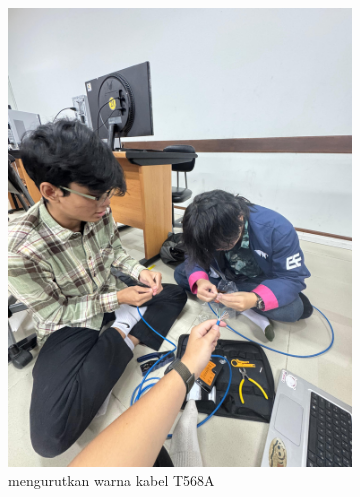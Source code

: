 \begin{figure}[H]
    \centering
    \begin{subfigure}[b]{0.3\linewidth}
      \centering
      \includegraphics[width=\linewidth]{image/crimping1.jpg}
      \caption{mengurutkan warna kabel T568A}
    \end{subfigure}
    \hspace{1cm}
    \begin{subfigure}[b]{0.3\linewidth}
      \centering

\end{subfigure}
\end{figure}
